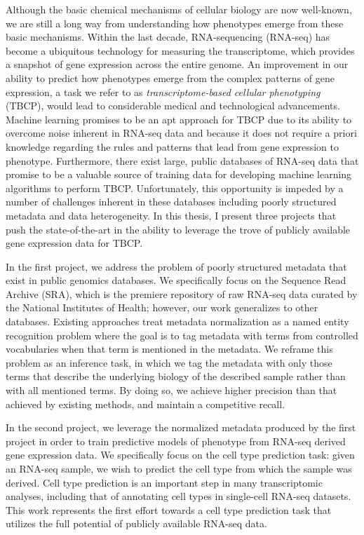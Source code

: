 Although the basic chemical mechanisms of cellular biology are now well-known, we are still a long way from understanding how phenotypes emerge from these basic mechanisms. Within the last decade, RNA-sequencing (RNA-seq) has become a ubiquitous technology for measuring the transcriptome, which provides a snapshot of gene expression across the entire genome.  An improvement in our ability to predict how phenotypes emerge from the complex patterns of gene expression, a task we refer to as \textit{transcriptome-based cellular phenotyping} (TBCP), would lead to considerable medical and technological advancements.  Machine learning promises to be an apt approach for TBCP due to its ability to overcome noise inherent in RNA-seq data and because it does not require a priori knowledge regarding the rules and patterns that lead from gene expression to phenotype. Furthermore, there exist large, public databases of RNA-seq data that promise to be a valuable source of training data for developing machine learning algorithms to perform TBCP.  Unfortunately, this opportunity is impeded by a number of challenges inherent in these databases including poorly structured metadata and data heterogeneity.  In this thesis, I present three projects that push the state-of-the-art in the ability to leverage the trove of publicly available gene expression data for TBCP. 

In the first project, we address the problem of poorly structured metadata that exist in public genomics databases. We specifically focus on the Sequence Read Archive (SRA), which is the premiere repository of raw RNA-seq data curated by the National Institutes of Health; however, our work generalizes to other databases.  Existing approaches treat metadata normalization as a named entity recognition problem where the goal is to tag metadata with terms from controlled vocabularies when that term is mentioned in the metadata. We reframe this problem as an inference task, in which we tag the metadata with only those terms that describe the underlying biology of the described sample rather than with all mentioned terms. By doing so, we achieve higher precision than that achieved by existing methods, and maintain a competitive recall.
 
In the second project, we leverage the normalized metadata produced by the first project in order to train predictive models of phenotype from RNA-seq derived gene expression data. We specifically focus on the cell type prediction task: given an RNA-seq sample, we wish to predict the cell type from which the sample was derived.  Cell type prediction is an important step in many transcriptomic analyses, including that of annotating cell types in single-cell RNA-seq datasets. This work represents the first effort towards a cell type prediction task that utilizes the full potential of publicly available RNA-seq data.  
 
